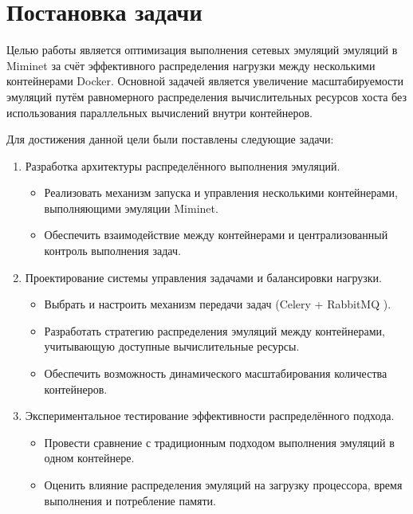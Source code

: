 
\section{Постановка задачи}
\label{sec:task}

Целью работы является оптимизация выполнения сетевых эмуляций эмуляций в Miminet\cite{miminet} за счёт эффективного распределения нагрузки между несколькими контейнерами Docker.
Основной задачей является увеличение масштабируемости эмуляций путём равномерного распределения вычислительных ресурсов хоста без использования параллельных вычислений внутри контейнеров.

Для достижения данной цели были поставлены следующие задачи:
\begin{enumerate}
    \item Разработка архитектуры распределённого выполнения эмуляций.
        \begin{itemize}
            \item Реализовать механизм запуска и управления несколькими контейнерами, выполняющими эмуляции Miminet\cite{miminet}.
            \item Обеспечить взаимодействие между контейнерами и централизованный контроль выполнения задач.
        \end{itemize}
    \item Проектирование системы управления задачами и балансировки нагрузки.
        \begin{itemize}
            \item Выбрать и настроить механизм передачи задач (Celery \cite{celery} + RabbitMQ \cite{rabbitmq}).
            \item Разработать стратегию распределения эмуляций между контейнерами, учитывающую доступные вычислительные ресурсы.
            \item Обеспечить возможность динамического масштабирования количества контейнеров.
        \end{itemize}
    \item Экспериментальное тестирование эффективности распределённого подхода.
        \begin{itemize}
            \item Провести сравнение с традиционным подходом выполнения эмуляций в одном контейнере.
            \item Оценить влияние распределения эмуляций на загрузку процессора, время выполнения и потребление памяти.

\end{itemize}
\end{enumerate}
